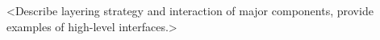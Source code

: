%


<Describe layering strategy and interaction of major components,
provide examples of high-level interfaces.>

